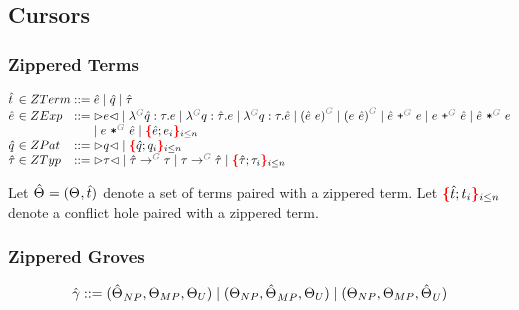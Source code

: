 \subsection{Cursors}


\subsubsection{Zippered Terms}

\[
  \arraycolsep=0pt
  \begin{array}{lcllll}
    \Z{t} & {}\in{} & ZTerm & {}::={} &
      \Z{e}
      \mid \Z{q}
      \mid \Z{\tau}
    \\
    \Z{e} & {}\in{} & ZExp & {}::={} &
      \cursor{e}
      \mid \eFun{G}{\Z{q}}{\tau}{e}
      \mid \eFun{G}{q}{\Z{\tau}}{e}
      \mid \eFun{G}{q}{\tau}{\Z{e}}
      \mid \eApp{G}{\Z{e}}{e}
      \mid \eApp{G}{e}{\Z{e}}
      \mid \ePlus{G}{\Z{e}}{e}
      \mid \ePlus{G}{e}{\Z{e}}
      \mid \eTimes{G}{\Z{e}}{e}
      \\
    &&&&
    \mid \eTimes{G}{e}{\Z{e}}
      \mid \conflictHoleForm{\Z{e}; e_i}{i \leq n}
    \\
    \Z{q} & {}\in{} & ZPat & {}::={} &
      \cursor{q}
      \mid \conflictHoleForm{\Z{q}; q_i}{i \leq n}
    \\
    \Z{\tau} & {}\in{} & ZTyp & {}::={} &
      \cursor{\tau}
      \mid \tArrow{G}{\Z{\tau}}{\tau}
      \mid \tArrow{G}{\tau}{\Z{\tau}}
      \mid \conflictHoleForm{\Z{\tau}; \tau_i}{i \leq n}
    \\
  \end{array}
\]

Let $\hat{\Theta_{}} = (\Theta_{}, \hat{t})$ denote a set of terms paired with a zippered term.
Let $\textcolor{red}{\textbf{\{}}\hat{t}; t_i\textcolor{red}{\textbf{\}}}_{i \leq n}$ denote a conflict hole paired with a zippered term.


\subsubsection{Zippered Groves}

\begin{gather*}
  \arraycolsep=0pt
  \begin{array}{lll}
    \Z{\gamma} & {}::={} &
      (\Z{\Set}_{NP}, \Set[MP], \Set[U])
      \mid (\Set[NP], \Z{\Set}_{MP}, \Set[U])
      \mid (\Set[NP], \Set[MP], \Z{\Set}_U)
  \end{array}
\end{gather*}

